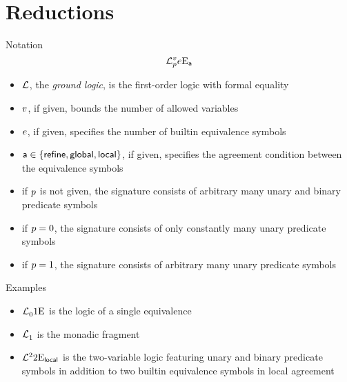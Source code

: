 \documentclass{beamer}
\begin{document}
\section{Reductions}
\begin{frame}{Notation}
\[
  \mathcal{L}^{v}_{p}{e}\mathrm{E}_{\mathsf{a}}
\]
\begin{itemize}
  \item
  $\mathcal{L}$, the \emph{ground logic}, is the first-order logic with formal equality
  
  \pause
  \item
  $v$, if given, bounds the number of allowed variables
  
  \pause
  \item
  $e$, if given, specifies the number of builtin equivalence symbols
  
  \pause
  \item
  $\mathsf{a}\in\left\{\mathsf{refine},\mathsf{global},\mathsf{local}\right\}$, if given, specifies the agreement
  condition between the equivalence symbols
  
  \pause
  \item
  if $p$ is not given, the signature consists of arbitrary many unary and
  binary predicate symbols
  
  \pause
  \item
  if $p = 0$, the signature consists of only constantly many unary predicate
  symbols
  
  \pause
  \item
  if $p = 1$, the signature consists of arbitrary many unary predicate
  symbols
\end{itemize}
\end{frame}

\begin{frame}{Examples}
\begin{itemize}
  \item
  $\mathcal{L}^{{}}_{0}{1}\mathrm{E}_{{}}$ is the logic of a single equivalence
  
  \item
  $\mathcal{L}^{{}}_{1}$ is the monadic fragment
  
  \item
  $\mathcal{L}^{2}_{{}}{2}\mathrm{E}_{\mathsf{local}}$ is the two-variable logic featuring unary and
  binary predicate symbols in addition to two builtin equivalence symbols in
  local agreement
\end{itemize}
\end{frame}
\end{document}
